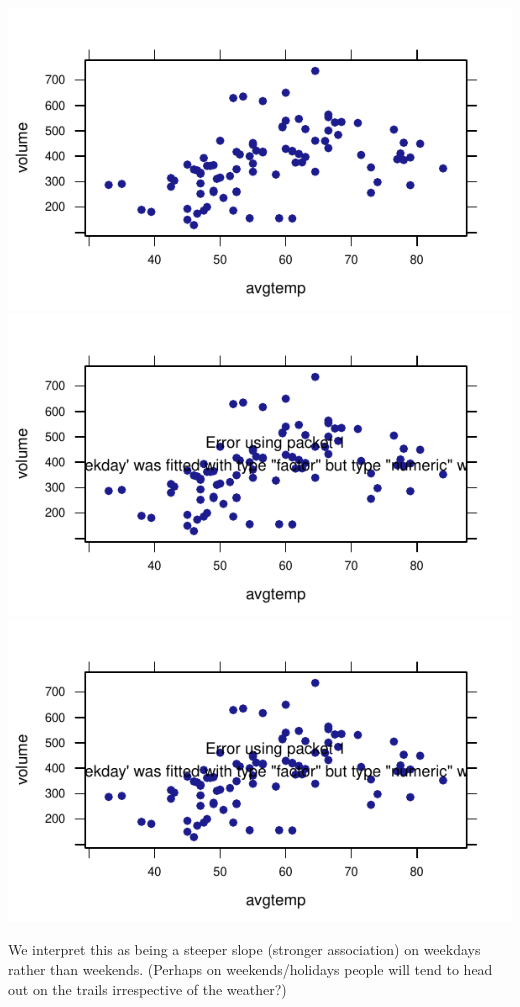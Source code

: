 \documentclass{tufte-book}\usepackage[]{graphicx}\usepackage[]{xcolor}
\makeatletter
\def\maxwidth{ %
  \ifdim\Gin@nat@width>\linewidth
    \linewidth
  \else
    \Gin@nat@width
  \fi
}
\newenvironment{knitrout}{}{} %
\makeatother
\begin{document}
\begin{solution}
\begin{knitrout}
{\centering \includegraphics[width=\maxwidth]{figures/FrontMatter-unnamed-chunk-74-1} 
\includegraphics[width=\maxwidth]{figures/FrontMatter-unnamed-chunk-74-2} 
\includegraphics[width=\maxwidth]{figures/FrontMatter-unnamed-chunk-74-3} 

}



\end{knitrout}
We
interpret this as being a steeper slope (stronger association) on weekdays rather than weekends.
(Perhaps on weekends/holidays people will tend to head out on the trails irrespective of the weather?)
\end{solution}
\end{document}
